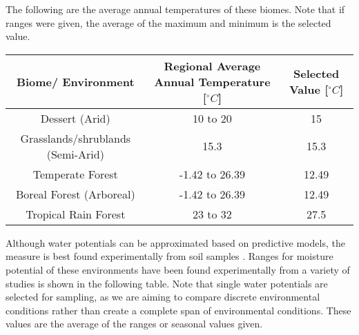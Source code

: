 \documentclass{article}
\begin{document}
The following are the average annual temperatures of these biomes. Note that if ranges were given, the average of the maximum and minimum is the selected value.

\begin{table}[H]
\begin{center}
 \begin{tabular}{|c c c|} 
 \hline
 Biome/ Environment & Regional Average Annual Temperature [$^{\circ}C$] & Selected Value [$^{\circ}C$]\\ [0.5ex] 
 \hline\hline
 Dessert (Arid) & 10 to 20 \cite{Davey2007} & 15 \\ 
 \hline
 Grasslands/shrublands (Semi-Arid) & 15.3 \cite{Pelaez1992} & 15.3 \\
 \hline
 Temperate Forest & -1.42 to 26.39 \cite{Zaz2018} & 12.49 \\
 \hline
 Boreal Forest (Arboreal)& -1.42 to 26.39 \cite{Zaz2018} & 12.49 \\
 \hline
 Tropical Rain Forest & 23 to 32 \cite{Paton2020} &27.5 \\
 \hline
\end{tabular}
\end{center}
\end{table}

 Although water potentials can be approximated based on predictive models, the measure is best found experimentally from soil samples \cite{Abkenar2019}. Ranges for moisture potential of these environments have been found experimentally from a variety of studies is shown in the following table. Note that single water potentials are selected for sampling, as we are aiming to compare discrete environmental conditions rather than create a complete span of environmental conditions. These values are the average of the ranges or seasonal values given.
\end{document}
